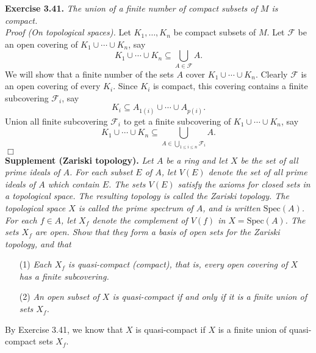 \documentclass{article}
\begin{document}



\textbf{Exercise 3.41.}
\emph{The union of a finite number of compact subsets of $M$ is compact.} \\

\emph{Proof (On topological spaces).}
Let $K_1, \ldots, K_n$ be compact subsets of $M$.
Let $\mathscr{F}$ be an open covering of $K_1 \cup \cdots \cup K_n$, say
$$K_1 \cup \cdots \cup K_n \subseteq \bigcup_{A \in \mathscr{F}}A.$$
We will show that a finite number of the sets $A$ cover $K_1 \cup \cdots \cup K_n$.
Clearly $\mathscr{F}$ is an open covering of every $K_i$.
Since $K_i$ is compact, this covering contains a finite subcovering $\mathscr{F}_i$,
say
$$K_i \subseteq A_{1(i)} \cup \cdots \cup A_{p(i)}.$$
Union all finite subcovering $\mathscr{F}_i$ to get a finite subcovering of
$K_1 \cup \cdots \cup K_n$, say
$$K_1 \cup \cdots \cup K_n \subseteq
\bigcup_{A \in \bigcup_{1 \leq i \leq n} \mathscr{F}_i}A.$$
$\Box$ \\

\textbf{Supplement (Zariski topology).}
\emph{Let $A$ be a ring and let $X$ be the set of all prime ideals of $A$.
For each subset $E$ of $A$,
let $V(E)$ denote the set of all prime ideals of $A$ which contain $E$.
The sets $V(E)$ satisfy
the axioms for closed sets in a topological space.
The resulting topology is called the Zariski topology.
The topological space $X$ is called the prime spectrum of $A$,
and is written $\text{Spec}(A)$.} \\

\emph{For each $f \in A$,
let $X_f$ denote the complement of $V(f)$ in $X = \text{Spec}(A)$.
The sets $X_f$ are open.
Show that they form a basis of open sets for the Zariski topology, and that}
\begin{enumerate}
\item[(1)]
\emph{Each $X_f$ is quasi-compact (compact), that is,
every open covering of $X$ has a finite subcovering.}
\item[(2)]
\emph{An open subset of $X$ is quasi-compact if and only if
it is a finite union of sets $X_f$.} \\
\end{enumerate}

By Exercise 3.41, we know that $X$ is quasi-compact if
$X$ is a finite union of quasi-compact sets $X_f$. \\\\



\end{document}

